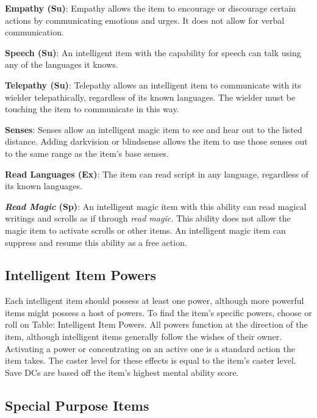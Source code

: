 \textbf{Empathy (Su)}: Empathy allows the item to encourage or discourage certain actions by communicating emotions and urges. It does not allow for verbal communication.
				
\textbf{Speech (Su)}: An intelligent item with the capability for speech can talk using any of the languages it knows.
				
\textbf{Telepathy (Su)}: Telepathy allows an intelligent item to communicate with its wielder telepathically, regardless of its known languages. The wielder must be touching the item to communicate in this way.
				
\textbf{Senses}: Senses allow an intelligent magic item to see and hear out to the listed distance. Adding darkvision or blindsense allows the item to use those senses out to the same range as the item's base senses.
				
\textbf{Read Languages (Ex)}: The item can read script in any language, regardless of its known languages.
				
\textbf{\textit{Read Magic} (Sp)}: An intelligent magic item with this ability can read magical writings and scrolls as if through \textit{read magic. }This ability does not allow the magic item to activate scrolls or other items. An intelligent magic item can suppress and resume this ability as a free action. 
				
\subsection{Intelligent Item Powers}

				
Each intelligent item should possess at least one power, although more powerful items might possess a host of powers. To find the item's specific powers, choose or roll on Table: Intelligent Item Powers. All powers function at the direction of the item, although intelligent items generally follow the wishes of their owner. Activating a power or concentrating on an active one is a standard action the item takes. The caster level for these effects is equal to the item's caster level. Save DCs are based off the item's highest mental ability score.
				
\subsection{Special Purpose Items}

